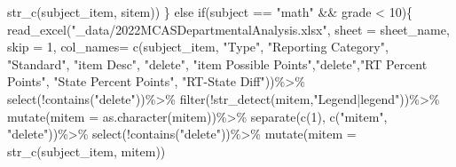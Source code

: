 \documentclass[
  letterpaper,
  DIV=11,
  numbers=noendperiod]{scrartcl}
\newenvironment{Shaded}{\begin{snugshade}}{\end{snugshade}}
\newcommand{\AttributeTok}[1]{\textcolor[rgb]{0.40,0.45,0.13}{#1}}
\newcommand{\ControlFlowTok}[1]{\textcolor[rgb]{0.00,0.23,0.31}{#1}}
\newcommand{\DecValTok}[1]{\textcolor[rgb]{0.68,0.00,0.00}{#1}}
\newcommand{\FunctionTok}[1]{\textcolor[rgb]{0.28,0.35,0.67}{#1}}
\newcommand{\NormalTok}[1]{\textcolor[rgb]{0.00,0.23,0.31}{#1}}
\newcommand{\SpecialCharTok}[1]{\textcolor[rgb]{0.37,0.37,0.37}{#1}}
\newcommand{\StringTok}[1]{\textcolor[rgb]{0.13,0.47,0.30}{#1}}
\begin{document}
\begin{Shaded}
\begin{Highlighting}[]
            \FunctionTok{str\_c}\NormalTok{(subject\_item, sitem))}
\NormalTok{   \}}
  \ControlFlowTok{else} \ControlFlowTok{if}\NormalTok{(subject }\SpecialCharTok{==} \StringTok{"math"} \SpecialCharTok{\&\&}\NormalTok{ grade }\SpecialCharTok{\textless{}} \DecValTok{10}\NormalTok{)\{}
     \FunctionTok{read\_excel}\NormalTok{(}\StringTok{"\_data/2022MCASDepartmentalAnalysis.xlsx"}\NormalTok{, }\AttributeTok{sheet =}\NormalTok{ sheet\_name, }
              \AttributeTok{skip =} \DecValTok{1}\NormalTok{, }\AttributeTok{col\_names=} \FunctionTok{c}\NormalTok{(subject\_item, }\StringTok{"Type"}\NormalTok{, }\StringTok{"Reporting Category"}\NormalTok{, }\StringTok{"Standard"}\NormalTok{, }\StringTok{"item Desc"}\NormalTok{, }\StringTok{"delete"}\NormalTok{, }\StringTok{"item Possible Points"}\NormalTok{,}\StringTok{"delete"}\NormalTok{,}\StringTok{"RT Percent Points"}\NormalTok{, }\StringTok{"State Percent Points"}\NormalTok{, }\StringTok{"RT{-}State Diff"}\NormalTok{))}\SpecialCharTok{\%\textgreater{}\%}
                   \FunctionTok{select}\NormalTok{(}\SpecialCharTok{!}\FunctionTok{contains}\NormalTok{(}\StringTok{"delete"}\NormalTok{))}\SpecialCharTok{\%\textgreater{}\%}
                   \FunctionTok{filter}\NormalTok{(}\SpecialCharTok{!}\FunctionTok{str\_detect}\NormalTok{(mitem,}\StringTok{"Legend|legend"}\NormalTok{))}\SpecialCharTok{\%\textgreater{}\%}
     \FunctionTok{mutate}\NormalTok{(}\AttributeTok{mitem =} \FunctionTok{as.character}\NormalTok{(mitem))}\SpecialCharTok{\%\textgreater{}\%}
     \FunctionTok{separate}\NormalTok{(}\FunctionTok{c}\NormalTok{(}\DecValTok{1}\NormalTok{), }\FunctionTok{c}\NormalTok{(}\StringTok{"mitem"}\NormalTok{, }\StringTok{"delete"}\NormalTok{))}\SpecialCharTok{\%\textgreater{}\%}
   \FunctionTok{select}\NormalTok{(}\SpecialCharTok{!}\FunctionTok{contains}\NormalTok{(}\StringTok{"delete"}\NormalTok{))}\SpecialCharTok{\%\textgreater{}\%}
    \FunctionTok{mutate}\NormalTok{(}\AttributeTok{mitem =}
             \FunctionTok{str\_c}\NormalTok{(subject\_item, mitem))}
     

\end{Highlighting}
\end{Shaded}
\end{document}

